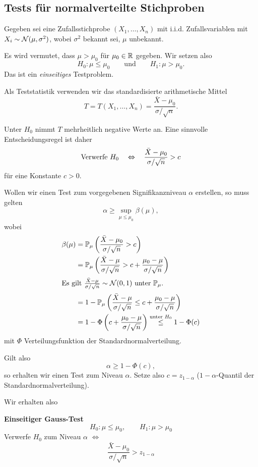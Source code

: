 \subsection{Tests für normalverteilte Stichproben}
\begin{exmp}
  Gegeben sei eine Zufallsstichprobe $(X_1, \ldots, X_n)$ mit i.i.d.
  Zufallsvariablen mit $X_i \sim \mathcal{N}(\mu, \sigma^2)$, wobei $\sigma^2$
  bekannt sei, $\mu$ unbekannt.

  Es wird vermutet, dass $\mu > \mu_0$ für $\mu_0 \in \mathbb{R}$  gegeben. Wir
  setzen also 
  \[ H_0 : \mu \le \mu_0 \qquad \text{und} \qquad H_1: \mu > \mu_0. \]
  Das ist ein \emph{einseitiges} Testproblem.

  Als Teststatistik verwenden wir das standardisierte arithmetische Mittel
  \[ T = T(X_1, \ldots, X_n) = \frac{\bar{X}-\mu_0}{\sigma / \sqrt{n}}. \]

  Unter $H_0$ nimmt $T$ mehrheitlich negative Werte an. Eine sinnvolle
  Entscheidungsregel ist daher
  \[ \text{Verwerfe } H_0 \quad \Leftrightarrow \quad \frac{\bar{X}-\mu_0}{\sigma / \sqrt{n}} > c \]
  für eine Konstante $c > 0$.

  Wollen wir einen Test zum vorgegebenen Signifikanzniveau $\alpha$ erstellen,
  so muss gelten
  \[ \alpha \ge \sup_{\mu \le \mu_0} \beta(\mu), \]
  wobei
  \begin{align*}
    \beta(\mu)
    &= \mathbb{P}_\mu \left( \frac{\bar{X}-\mu_0}{\sigma / \sqrt{n}} > c \right) \\
    &= \mathbb{P}_\mu \left( \frac{\bar{X}-\mu}{\sigma / \sqrt{n}} > c
      + \frac{\mu_0 - \mu}{\sigma / \sqrt{n}} \right) \\
    \intertext{Es gilt
    $\frac{\bar{X}-\mu}{\sigma / \sqrt{n}} \sim \mathcal{N}(0,1)$
    unter $\mathbb{P}_\mu$.}
    &= 1 - \mathbb{P}_\mu \left( \frac{\bar{X}-\mu}{\sigma / \sqrt{n}} \le c
      + \frac{\mu_0 - \mu}{\sigma / \sqrt{n}} \right) \\
    &= 1 - \Phi \left(c + \frac{\mu_0 - \mu}{\sigma / \sqrt{n}} \right)
      \overset{\text{unter } H_0}{\le} 1 - \Phi(c)
  \end{align*}
  mit $\Phi$ Verteilungsfunktion der Standardnormalverteilung.

  Gilt also
  \[ \alpha \ge 1 - \Phi(c), \]
  so erhalten wir einen Test zum Niveau $\alpha$. Setze also $c = z_{1-\alpha}$
  ($1-\alpha$-Quantil der Standardnormalverteilung).

  Wir erhalten also
  \begin{mdframed}
    \textbf{Einseitiger Gauss-Test}
    \[ H_0 : \mu \le \mu_0, \qquad H_1 : \mu > \mu_0 \]
    Verwerfe $H_0$ zum Niveau $\alpha$ $\Leftrightarrow$
    \[ \frac{\bar{X}-\mu_0}{\sigma/\sqrt{n}} > z_{1-\alpha} \]
  \end{mdframed}
  

\end{exmp}
